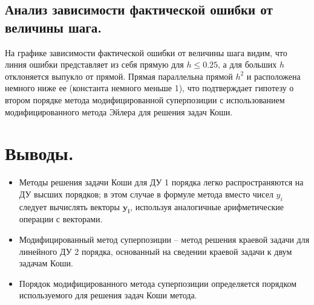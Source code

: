 \documentclass[a4paper, 12pt]{article}
\begin{document}
	\subsection{Анализ зависимости фактической ошибки от величины шага.}
	
	На графике зависимости фактической ошибки от величины шага видим, что линия ошибки представляет из себя прямую для $h\leq0.25$, а для больших $h$ отклоняется выпукло от прямой. Прямая параллельна прямой $h^2$ и расположена немного ниже ее (константа немного меньше 1), что подтверждает гипотезу о втором порядке метода модифицированной суперпозиции с использованием модифицированного метода Эйлера для решения задач Коши.
	
	\section{Выводы.}
	
	\begin{itemize}
		\item Методы решения задачи Коши для ДУ 1 порядка легко распространяются на ДУ высших порядков; в этом случае в формуле метода вместо чисел $y_i$ следует вычислять векторы $\mathbf{y_i}$, используя аналогичные арифметические операции с векторами.
		\item Модифицированный метод суперпозиции -- метод решения краевой задачи для линейного ДУ 2 порядка, основанный на сведении краевой задачи к двум задачам Коши.
		\item Порядок модифицированного метода суперпозиции определяется порядком используемого для решения задач Коши метода.
	\end{itemize}
	
\end{document}
